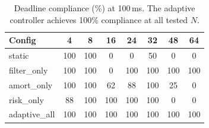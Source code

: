 \begin{table}[t]
\caption{Deadline compliance (\%) at 100\,ms.  The adaptive controller
  achieves 100\% compliance at all tested $N$.}
\label{tab:ablation_deadline}
\small
\begin{tabularx}{\linewidth}{lCCCCCCC}
\toprule
\textbf{Config} & \textbf{4} & \textbf{8} & \textbf{16}
  & \textbf{24} & \textbf{32} & \textbf{48} & \textbf{64} \\
\midrule
static         & 100 & 100 &  0 &   0 &  50 &  0 &  0 \\
filter\_only   & 100 & 100 &  0 & 100 & 100 & 100 & 100 \\
amort\_only    & 100 & 100 & 62 &  88 & 100 &  25 &  0 \\
risk\_only     &  88 & 100 & 100 & 100 & 100 &  0 &  0 \\
adaptive\_all  & 100 & 100 & 100 & 100 & 100 & 100 & 100 \\
\bottomrule
\end{tabularx}
\end{table}
